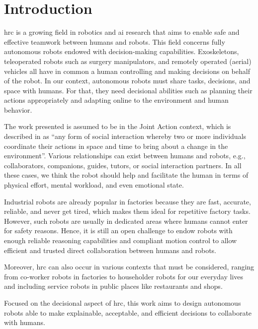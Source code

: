 \chapter*{Introduction}




\minitoc

\acrfull{hrc} is a growing field in robotics and \acrfull{ai} research that aims to enable safe and effective teamwork between humans and robots.
This field concerns fully autonomous robots endowed with decision-making capabilities. Exoskeletons, teleoperated robots such as surgery manipulators, and remotely operated (aerial) vehicles all have in common a human controlling and making decisions on behalf of the robot. In our context, autonomous robots must share tasks, decisions, and space with humans. For that, they need decisional abilities such as planning their actions appropriately and adapting online to the environment and human behavior.

The work presented is assumed to be in the Joint Action context, which is described in \cite{sebanz_joint_2006} as ``any form of social interaction whereby two or more individuals coordinate their actions in space and time to bring about a change in the environment''. Various relationships can exist between humans and robots, e.g., collaborators, companions, guides, tutors, or social interaction partners. In all these cases, we think the robot should help and facilitate the human in terms of physical effort, mental workload, and even emotional state.

Industrial robots are already popular in factories because they are fast, accurate, reliable, and never get tired, which makes them ideal for repetitive factory tasks. 
However, such robots are usually in dedicated areas where humans cannot enter for safety reasons. 
Hence, it is still an open challenge to endow robots with enough reliable reasoning capabilities and compliant motion control to allow efficient and trusted direct collaboration between humans and robots. 

Moreover, \acrshort{hrc} can also occur in various contexts that must be considered, ranging from co-worker robots in factories to householder robots for our everyday lives and including service robots in public places like restaurants and shops.

Focused on the decisional aspect of \acrshort{hrc}, this work aims to design autonomous robots able to make explainable, acceptable, and efficient decisions to collaborate with humans. 

